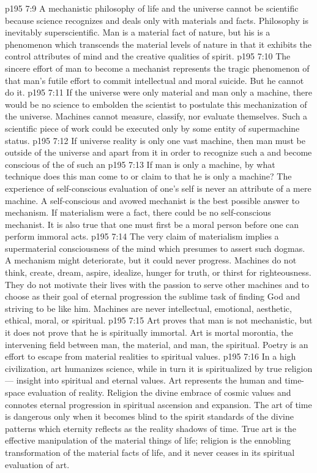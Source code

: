 \vs p195 7:9 A mechanistic philosophy of life and the universe cannot be scientific because science recognizes and deals only with materials and facts. Philosophy is inevitably superscientific. Man is a material fact of nature, but his  is a phenomenon which transcends the material levels of nature in that it exhibits the control attributes of mind and the creative qualities of spirit.
\vs p195 7:10 The sincere effort of man to become a mechanist represents the tragic phenomenon of that man’s futile effort to commit intellectual and moral suicide. But he cannot do it.
\vs p195 7:11 If the universe were only material and man only a machine, there would be no science to embolden the scientist to postulate this mechanization of the universe. Machines cannot measure, classify, nor evaluate themselves. Such a scientific piece of work could be executed only by some entity of supermachine status.
\vs p195 7:12 If universe reality is only one vast machine, then man must be outside of the universe and apart from it in order to recognize such a  and become conscious of the  of such an 
\vs p195 7:13 \pc If man is only a machine, by what technique does this man come to  or claim to  that he is only a machine? The experience of self\hyp{}conscious evaluation of one’s self is never an attribute of a mere machine. A self\hyp{}conscious and avowed mechanist is the best possible answer to mechanism. If materialism were a fact, there could be no self\hyp{}conscious mechanist. It is also true that one must first be a moral person before one can perform immoral acts.
\vs p195 7:14 \pc The very claim of materialism implies a supermaterial consciousness of the mind which presumes to assert such dogmas. A mechanism might deteriorate, but it could never progress. Machines do not think, create, dream, aspire, idealize, hunger for truth, or thirst for righteousness. They do not motivate their lives with the passion to serve other machines and to choose as their goal of eternal progression the sublime task of finding God and striving to be like him. Machines are never intellectual, emotional, aesthetic, ethical, moral, or spiritual.
\vs p195 7:15 Art proves that man is not mechanistic, but it does not prove that he is spiritually immortal. Art is mortal morontia, the intervening field between man, the material, and man, the spiritual. Poetry is an effort to escape from material realities to spiritual values.
\vs p195 7:16 In a high civilization, art humanizes science, while in turn it is spiritualized by true religion --- insight into spiritual and eternal values. Art represents the human and time\hyp{}space evaluation of reality. Religion  the divine embrace of cosmic values and connotes eternal progression in spiritual ascension and expansion. The art of time is dangerous only when it becomes blind to the spirit standards of the divine patterns which eternity reflects as the reality shadows of time. True art is the effective manipulation of the material things of life; religion is the ennobling transformation of the material facts of life, and it never ceases in its spiritual evaluation of art.
